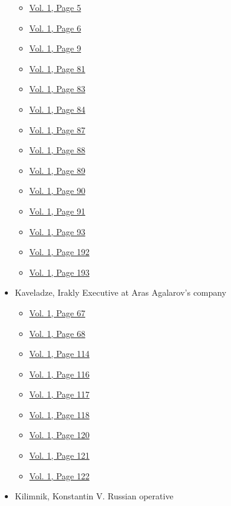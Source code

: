 \begin{itemize}
  \begin{itemize}
  \tightlist
  \item
    \protect\hyperlink{g-page-13}{Vol. 1, Page 5}
  \item
    \protect\hyperlink{g-page-14}{Vol. 1, Page 6}
  \item
    \protect\hyperlink{g-page-17}{Vol. 1, Page 9}
  \item
    \protect\hyperlink{g-page-89}{Vol. 1, Page 81}
  \item
    \protect\hyperlink{g-page-91}{Vol. 1, Page 83}
  \item
    \protect\hyperlink{g-page-92}{Vol. 1, Page 84}
  \item
    \protect\hyperlink{g-page-95}{Vol. 1, Page 87}
  \item
    \protect\hyperlink{g-page-96}{Vol. 1, Page 88}
  \item
    \protect\hyperlink{g-page-97}{Vol. 1, Page 89}
  \item
    \protect\hyperlink{g-page-98}{Vol. 1, Page 90}
  \item
    \protect\hyperlink{g-page-99}{Vol. 1, Page 91}
  \item
    \protect\hyperlink{g-page-101}{Vol. 1, Page 93}
  \item
    \protect\hyperlink{g-page-200}{Vol. 1, Page 192}
  \item
    \protect\hyperlink{g-page-201}{Vol. 1, Page 193}
  \end{itemize}
\item
  Kaveladze, Irakly Executive at Aras Agalarov's company

  \begin{itemize}
  \tightlist
  \item
    \protect\hyperlink{g-page-75}{Vol. 1, Page 67}
  \item
    \protect\hyperlink{g-page-76}{Vol. 1, Page 68}
  \item
    \protect\hyperlink{g-page-122}{Vol. 1, Page 114}
  \item
    \protect\hyperlink{g-page-124}{Vol. 1, Page 116}
  \item
    \protect\hyperlink{g-page-125}{Vol. 1, Page 117}
  \item
    \protect\hyperlink{g-page-126}{Vol. 1, Page 118}
  \item
    \protect\hyperlink{g-page-128}{Vol. 1, Page 120}
  \item
    \protect\hyperlink{g-page-129}{Vol. 1, Page 121}
  \item
    \protect\hyperlink{g-page-130}{Vol. 1, Page 122}
  \end{itemize}
\item
  Kilimnik, Konstantin V. Russian operative


\end{itemize}
